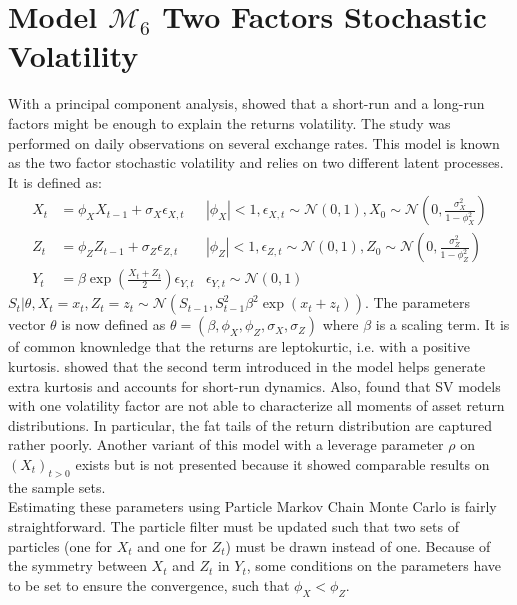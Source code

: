 \documentclass[11pt,a4,twosided,singlespacing,titlepagenumber=on]{scrreprt}
\numberwithin{equation}{chapter} %
\theoremstyle{remark}
\begin{document}
\section{Model $\mathcal{M}_6$ Two Factors Stochastic Volatility}
With a principal component analysis, \cite{harvey1994} showed that a short-run and a long-run factors might be enough to explain the returns volatility. The study was performed on daily observations on several exchange rates. This model is known as the two factor stochastic volatility and relies on two different latent processes. It is defined as:
\begin{align*}
  X_t 						&=  \phi_X X_{t-1} + \sigma_X \epsilon_{X,t} &|\phi_X| < 1, \epsilon_{X,t} \sim \mathcal{N}(0,1), X_0 \sim \mathcal{N} \left(0, \frac{\sigma_X^2}{1 - \phi_X^2} \right)\\
  Z_t 						&=  \phi_Z Z_{t-1} + \sigma_Z \epsilon_{Z,t} &|\phi_Z| < 1, \epsilon_{Z,t} \sim \mathcal{N}(0,1), Z_0 \sim \mathcal{N} \left(0, \frac{\sigma_Z^2}{1 - \phi_Z^2} \right)\\
  Y_t 						&=  \beta \exp \left( \frac{X_t+Z_t}{2} \right) \epsilon_{Y,t} &\epsilon_{Y,t} \sim \mathcal{N}(0,1)
\end{align*}
$S_t | \theta, X_t = x_t, Z_t = z_t \sim \mathcal{N}\left(S_{t-1}, S_{t-1}^2 \beta^2 \exp \left(x_t + z_t\right) \right)$. The parameters vector $\theta$ is now defined as $\theta = (\beta, \phi_X, \phi_Z, \sigma_X, \sigma_Z)$ where $\beta$ is a scaling term. It is of common knownledge that the returns are leptokurtic, i.e. with a positive kurtosis. \cite{veiga2006} showed that the second term introduced in the model helps generate extra kurtosis and accounts for short-run dynamics. Also, \cite{chernov2000} found that SV models with one volatility factor are not able to characterize all moments of asset return distributions. In particular, the fat tails of the return distribution are captured rather poorly. Another variant of this model with a leverage parameter $\rho$ on $(X_t)_{t>0}$ exists but is not presented because it showed comparable results on the sample sets.\\
\noindent
Estimating these parameters using Particle Markov Chain Monte Carlo is fairly straightforward. The particle filter must be updated such that two sets of particles (one for $X_t$ and one for $Z_t$) must be drawn instead of one. Because of the symmetry between $X_t$ and $Z_t$ in $Y_t$, some conditions on the parameters have to be set to ensure the convergence, such that $\phi_X < \phi_Z$.
\end{document}
